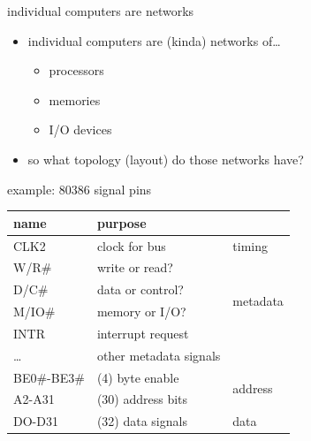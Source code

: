 \usetikzlibrary{arrows.meta,calc}


\tikzset{
    >=Latex,
}

\begin{frame}{individual computers are networks}
\begin{itemize}
    \item individual computers are (kinda) networks of\ldots
    \begin{itemize}
        \item processors
        \item memories
        \item I/O devices
    \end{itemize}
    \vspace{.5cm}
    \item so what topology (layout) do those networks have?
    \end{itemize}
\end{frame}



\begin{frame}{example: 80386 signal pins}
\begin{tabular}{|l|l|l|}
\hline
\bfseries name & \multicolumn{2}{|l|}{\bfseries purpose} \\ \hline 
CLK2 & clock for bus & timing\\ \hline
W/R\# & write or read? & \multirow{4}{*}{metadata} \\ \cline{1-2}
D/C\# & data or control? &~ \\ \cline{1-2}
M/IO\# & memory or I/O? &~\\ \cline{1-2}
INTR & interrupt request &~\\ \cline{1-2}
\ldots & other metadata signals &~\\ \hline
BE0\#-BE3\# & (4) byte enable & \multirow{2}{*}{address} \\\cline{1-2}
A2-A31 & (30) address bits &~\\ \hline
DO-D31 & (32) data signals & data\\ \hline
\end{tabular}
\end{frame}


